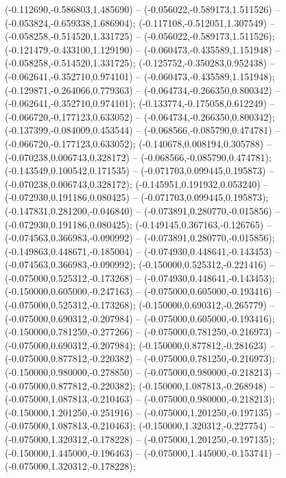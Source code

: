  (-0.112690,-0.586803,1.485690) -- (-0.056022,-0.589173,1.511526) -- (-0.053824,-0.659338,1.686904);
 (-0.117108,-0.512051,1.307549) -- (-0.058258,-0.514520,1.331725) -- (-0.056022,-0.589173,1.511526);
 (-0.121479,-0.433100,1.129190) -- (-0.060473,-0.435589,1.151948) -- (-0.058258,-0.514520,1.331725);
 (-0.125752,-0.350283,0.952438) -- (-0.062641,-0.352710,0.974101) -- (-0.060473,-0.435589,1.151948);
 (-0.129871,-0.264066,0.779363) -- (-0.064734,-0.266350,0.800342) -- (-0.062641,-0.352710,0.974101);
 (-0.133774,-0.175058,0.612249) -- (-0.066720,-0.177123,0.633052) -- (-0.064734,-0.266350,0.800342);
 (-0.137399,-0.084009,0.453544) -- (-0.068566,-0.085790,0.474781) -- (-0.066720,-0.177123,0.633052);
 (-0.140678,0.008194,0.305788) -- (-0.070238,0.006743,0.328172) -- (-0.068566,-0.085790,0.474781);
 (-0.143549,0.100542,0.171535) -- (-0.071703,0.099445,0.195873) -- (-0.070238,0.006743,0.328172);
 (-0.145951,0.191932,0.053240) -- (-0.072930,0.191186,0.080425) -- (-0.071703,0.099445,0.195873);
 (-0.147831,0.281200,-0.046840) -- (-0.073891,0.280770,-0.015856) -- (-0.072930,0.191186,0.080425);
 (-0.149145,0.367163,-0.126765) -- (-0.074563,0.366983,-0.090992) -- (-0.073891,0.280770,-0.015856);
 (-0.149863,0.448671,-0.185004) -- (-0.074930,0.448641,-0.143453) -- (-0.074563,0.366983,-0.090992);
 (-0.150000,0.525312,-0.221416) -- (-0.075000,0.525312,-0.173268) -- (-0.074930,0.448641,-0.143453);
 (-0.150000,0.605000,-0.247163) -- (-0.075000,0.605000,-0.193416) -- (-0.075000,0.525312,-0.173268);
 (-0.150000,0.690312,-0.265779) -- (-0.075000,0.690312,-0.207984) -- (-0.075000,0.605000,-0.193416);
 (-0.150000,0.781250,-0.277266) -- (-0.075000,0.781250,-0.216973) -- (-0.075000,0.690312,-0.207984);
 (-0.150000,0.877812,-0.281623) -- (-0.075000,0.877812,-0.220382) -- (-0.075000,0.781250,-0.216973);
 (-0.150000,0.980000,-0.278850) -- (-0.075000,0.980000,-0.218213) -- (-0.075000,0.877812,-0.220382);
 (-0.150000,1.087813,-0.268948) -- (-0.075000,1.087813,-0.210463) -- (-0.075000,0.980000,-0.218213);
 (-0.150000,1.201250,-0.251916) -- (-0.075000,1.201250,-0.197135) -- (-0.075000,1.087813,-0.210463);
 (-0.150000,1.320312,-0.227754) -- (-0.075000,1.320312,-0.178228) -- (-0.075000,1.201250,-0.197135);
 (-0.150000,1.445000,-0.196463) -- (-0.075000,1.445000,-0.153741) -- (-0.075000,1.320312,-0.178228);
